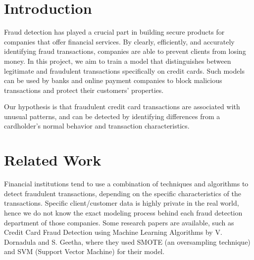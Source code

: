 \documentclass[sigconf, nonacm]{acmart}
\begin{document}



\maketitle

\section{Introduction}
Fraud detection has played a crucial part in building secure products for companies that offer financial services. By clearly, efficiently, and accurately identifying fraud transactions, companies are able to prevent clients from losing money. In this project, we aim to train a model that distinguishes between legitimate and fraudulent transactions specifically on credit cards. Such models can be used by banks and online payment companies to block malicious transactions and protect their customers’ properties.

Our hypothesis is that fraudulent credit card transactions are associated with unusual patterns, and can be detected by identifying differences from a cardholder’s normal behavior and transaction characteristics.

\section{Related Work}
Financial institutions tend to use a combination of techniques and algorithms to detect fraudulent transactions, depending on the specific characteristics of the transactions. Specific client/customer data is highly private in the real world, hence we do not know the exact modeling process behind each fraud detection department of those companies. Some research papers are available, such as Credit Card Fraud Detection using Machine Learning Algorithms by V. Dornadula and S. Geetha, where they used SMOTE (an oversampling technique) and SVM (Support Vector Machine) for their model.
\end{document}
